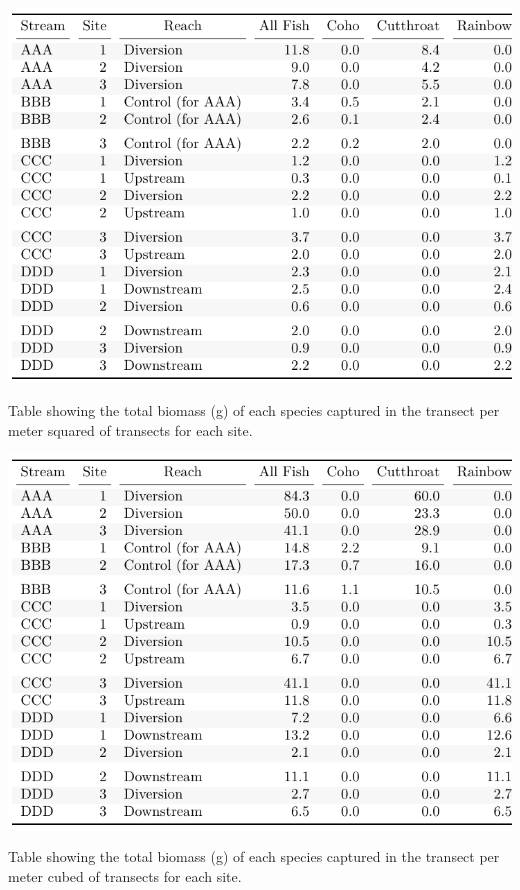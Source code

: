 \begin{table}[H]
\includegraphics{Chapter5Images/kable_gm2.pdf}
\caption{   \hspace{1mm}Table showing the total biomass (g) of each species captured in the transect per meter squared of transects for each site.}
\label{fig:kablemass2}
\end{table}



\begin{table}[H]
\includegraphics{Chapter5Images/kable_gm3.pdf}
\caption{  \hspace{1mm} Table showing the total biomass (g) of each species captured in the transect per meter cubed of transects for each site.}
\label{fig:kablemass3}
\end{table}



